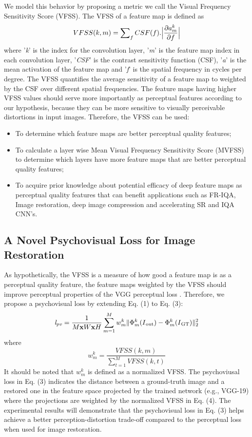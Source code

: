 \documentclass[10pt,twocolumn,letterpaper]{article}
\begin{document}
  We model this behavior by proposing a metric we call the Visual Frequency Sensitivity Score (VFSS). The VFSS of a feature map is defined as 
\begin{equation}
VFSS(k,m)=\sum\nolimits_{f}CSF(f).\abs\Big{\frac{\partial a_m^k}{\partial f}}
\end{equation}
where '\textit{k}' is the index for the convolution layer, '\textit{m}' is the feature map index in each convolution layer, '\textit{CSF}' is the contrast sensitivity function (CSF), '\textit{a}' is the mean activation of the feature map and '\textit{f}' is the spatial frequency in cycles per degree.
The VFSS quantifies the average sensitivity of a feature map to weighted by the CSF over different spatial frequencies. The feature maps having higher VFSS values should serve more importantly as perceptual features according to our hypothesis, because they can be more sensitive to visually perceivable distortions in input images. Therefore, the VFSS can be used:
\begin{itemize}
 \item To determine which feature maps are better perceptual quality features;
 \item To calculate a layer wise Mean Visual Frequency Sensitivity Score (MVFSS) to determine which layers have more feature maps that are better perceptual quality features;
 \item To acquire prior knowledge about potential efficacy of deep feature maps as perceptual quality features that can benefit applications such as FR-IQA, Image restoration, deep image compression and accelerating SR and IQA CNN's.
\end{itemize}

\subsection{A Novel Psychovisual Loss for Image Restoration}
As hypothetically, the VFSS is a measure of how good a feature map is as a perceptual quality feature, the feature maps weighted by the VFSS should improve perceptual properties of the VGG perceptual loss \cite{7}. Therefore, we propose a psychovisual loss by extending Eq. (1) to  Eq. (3):
\begin{equation}
\mathit{l_{pv}}=\frac{1}{M\mathbf{x} W\mathbf{x} H}\sum\limits_{m=1}^M w_m^k\Vert\Phi_m^k(I\textsubscript{out})-\Phi_m^k(I\textsubscript{GT})\Vert_2^2
\end{equation}
where
\begin{equation}
   w_m^k=\frac{VFSS(k,m)}{{\sum\limits_{t=1}^M VFSS(k,t)}}
\end{equation}
It should be noted that $w^k_m$ is defined as a normalized VFSS. The psychoviusal loss in Eq. (3) indicates the distance between a ground-truth image and a restored one in the feature space projected by the trained network (e.g., VGG-19) where the projections are weighted by the normalized VFSS in Eq. (4). The experimental results will demonstrate that the psychovisual loss in Eq. (3) helps achieve a better perception-distortion trade-off compared to the perceptual loss when used for image restoration. 
\end{document}
